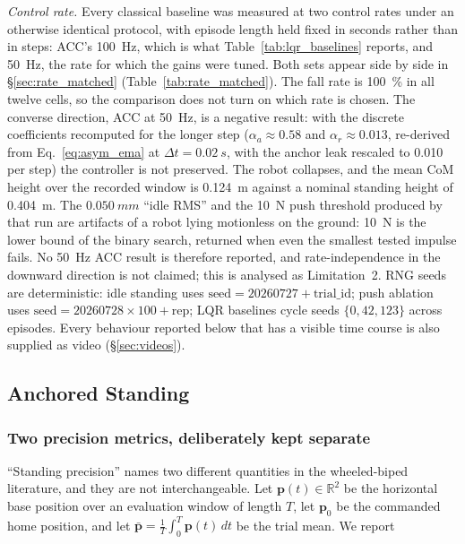 \documentclass[conference]{IEEEtran}
\begin{document}
\emph{Control rate.} Every classical baseline was measured at two control rates under an otherwise identical protocol, with episode length held fixed in seconds rather than in steps: ACC's \SI{100}{Hz}, which is what Table~\ref{tab:lqr_baselines} reports, and \SI{50}{Hz}, the rate for which the gains were tuned. Both sets appear side by side in \S\ref{sec:rate_matched} (Table~\ref{tab:rate_matched}). The fall rate is \SI{100}{\percent} in all twelve cells, so the comparison does not turn on which rate is chosen. The converse direction, ACC at \SI{50}{Hz}, is a negative result: with the discrete coefficients recomputed for the longer step ($\alpha_a{\approx}0.58$ and $\alpha_r{\approx}0.013$, re-derived from Eq.~\eqref{eq:asym_ema} at $\Delta t{=}\SI{0.02}{s}$, with the anchor leak rescaled to \num{0.010} per step) the controller is not preserved. The robot collapses, and the mean CoM height over the recorded window is \SI{0.124}{m} against a nominal standing height of \SI{0.404}{m}. The $\SI{0.050}{mm}$ ``idle RMS'' and the \SI{10}{N} push threshold produced by that run are artifacts of a robot lying motionless on the ground: \SI{10}{N} is the lower bound of the binary search, returned when even the smallest tested impulse fails. No \SI{50}{Hz} ACC result is therefore reported, and rate-independence in the downward direction is not claimed; this is analysed as Limitation~2.
RNG seeds are deterministic: idle standing uses $\text{seed} = 20260727 + \text{trial\_id}$; push ablation uses $\text{seed} = 20260728 \times 100 + \text{rep}$; LQR baselines cycle seeds $\{0, 42, 123\}$ across episodes. Every behaviour reported below that has a visible time course is also supplied as video (\S\ref{sec:videos}).

\subsection{Anchored Standing}
\label{sec:standing}

\subsubsection{Two precision metrics, deliberately kept separate}

``Standing precision'' names two different quantities in the wheeled-biped
literature, and they are not interchangeable. Let $\mathbf{p}(t)\in\mathbb{R}^2$ be
the horizontal base position over an evaluation window of length $T$, let
$\mathbf{p}_0$ be the commanded home position, and let
$\bar{\mathbf{p}}=\frac{1}{T}\int_0^T\mathbf{p}(t)\,dt$ be the trial mean. We report
\end{document}
